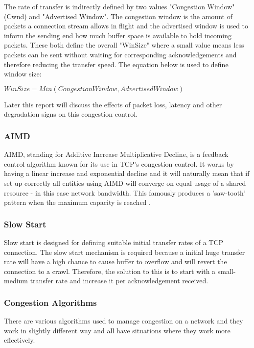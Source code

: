 The rate of transfer is indirectly defined by two values "Congestion Window" (Cwnd) and "Advertised Window". The congestion window is the amount of packets a connection stream allows in flight and the advertised window is used to inform the sending end how much buffer space is available to hold incoming packets. These both define the overall "WinSize" where a small value means less packets can be sent without waiting for corresponding acknowledgements and therefore reducing the transfer speed. The equation below is used to define window size: 

\begin{center}
	$WinSize = Min(CongestionWindow, AdvertisedWindow)$
\end{center}

Later this report will discuss the effects of packet loss, latency and other degradation signs on this congestion control.

 
\subsubsection*{AIMD}
AIMD, standing for Additive Increase Multiplicative Decline, is a feedback control algorithm known for its use in TCP's congestion control. It works by having a linear increase and exponential decline and it will naturally mean that if set up correctly all entities using AIMD will converge on equal usage of a shared resource - in this case network bandwidth. This famously produces a 'saw-tooth' pattern when the maximum capacity is reached \citep{huston2006gigabit}.

\subsubsection*{Slow Start}
\label{ref:slowstart}
Slow start is designed for defining suitable initial transfer rates of a TCP connection. The slow start mechanism is required because a initial huge transfer rate will have a high chance to cause buffer to overflow and will revert the connection to a crawl. Therefore, the solution to this is to start with a small-medium transfer rate and increase it per acknowledgement received.

\subsubsection*{Congestion Algorithms}
There are various algorithms used to manage congestion on a network and they work in slightly different way and all have situations where they work more effectively.


